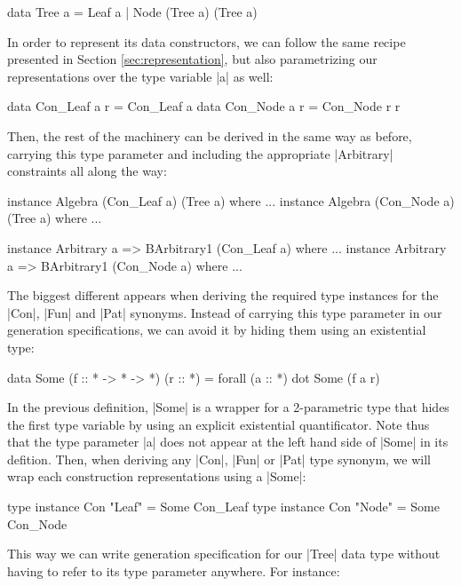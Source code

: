 \begin{code}
data Tree a = Leaf a | Node (Tree a) (Tree a)
\end{code}

In order to represent its data constructors, we can follow the same recipe
presented in Section \ref{sec:representation}, but also parametrizing our
representations over the type variable |a| as well:

\begin{code}
data Con_Leaf a r = Con_Leaf a
data Con_Node a r = Con_Node r r
\end{code}

Then, the rest of the machinery can be derived in the same way as before,
carrying this type parameter and including the appropriate |Arbitrary|
constraints all along the way:

\begin{code}
instance Algebra (Con_Leaf a) (Tree a) where ...
instance Algebra (Con_Node a) (Tree a) where ...

instance Arbitrary a => BArbitrary1 (Con_Leaf a) where ...
instance Arbitrary a => BArbitrary1 (Con_Node a) where ...
\end{code}

The biggest different appears when deriving the required type instances for the
|Con|, |Fun| and |Pat| synonyms.
%
Instead of carrying this type parameter in our generation specifications, we can
avoid it by hiding them using an existential type:

\begin{code}
data Some (f :: * -> * -> *) (r :: *) = forall (a :: *) dot Some (f a r)
\end{code}

In the previous definition, |Some| is a wrapper for a 2-parametric type that
hides the first type variable by using an explicit existential quantificator.
%
Note thus that the type parameter |a| does not appear at the left hand side of
|Some| in its defition.
%
Then, when deriving any |Con|, |Fun| or |Pat| type synonym, we will wrap each
construction representations using a |Some|:

\begin{code}
type instance Con "Leaf" = Some Con_Leaf
type instance Con "Node" = Some Con_Node
\end{code}

This way we can write generation specification for our |Tree| data type without
having to refer to its type parameter anywhere.
%
For instance:

